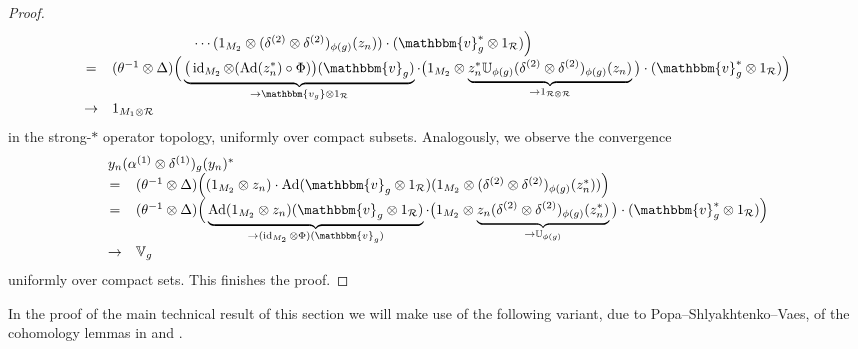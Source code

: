 \documentclass[11pt,a4paper]{article}
\theoremstyle{definition}
\theoremstyle{remark}
\numberwithin{equation}{section}
\numberwithin{theorem}{section}
\begin{document}
\begin{proof}
\[\begin{array}{cl}
& \phantom{ (\theta^{-1}\otimes\operatorname{id}_{\mathcal{R}})\Big( }\cdots (1_{M_2}\otimes(\delta^{(2)}\otimes\delta^{(2)})_{\phi(g)}(z_n))\cdot (\mathbbm{v}_g^* \otimes 1_{\mathcal R}) \Big) \\
=& (\theta^{-1}\otimes\Delta)\Big( \underbrace{ \big( \operatorname{id}_{M_2}\otimes (  \operatorname{Ad}(z_n^*)\circ\Phi ) \big) (\mathbbm{v}_g) }_{\to \mathbbm{v_g}\otimes 1_{\mathcal R} } 
\cdot \big( 1_{M_2}\otimes \underbrace{ z_n^*\mathbb{U}_{\phi(g)}(\delta^{(2)}\otimes\delta^{(2)})_{\phi(g)}(z_n) }_{\to 1_{\mathcal{R}\otimes\mathcal{R}} } \big)\cdot (\mathbbm{v}_g^* \otimes 1_{\mathcal R}) \Big) \\
\to & 1_{M_1\otimes\mathcal R} 
\end{array}
\]
in the strong-$*$ operator topology, uniformly over compact subsets.
Analogously, we observe the convergence
\[
\begin{array}{cl}
\multicolumn{2}{l}{ y_n(\alpha^{(1)}\otimes\delta^{(1)})_g(y_n)^* }\\
=& (\theta^{-1}\otimes\Delta)\Big( (1_{M_2}\otimes z_n) \cdot \operatorname{Ad}(\mathbbm{v}_g\otimes 1_{\mathcal R})(1_{M_2}\otimes(\delta^{(2)}\otimes\delta^{(2)})_{\phi(g)}(z_n^*) ) \Big) \\
=& (\theta^{-1}\otimes\Delta)\Big( \underbrace{ \operatorname{Ad}(1_{M_2}\otimes z_n)(\mathbbm{v}_g\otimes 1_{\mathcal R})}_{\to (\operatorname{id}_{M_2}\otimes\Phi)(\mathbbm{v}_g)}
 \cdot \big( 1_{M_2}\otimes \underbrace{ z_n(\delta^{(2)}\otimes\delta^{(2)})_{\phi(g)}(z_n^*) }_{\to \mathbb{U}_{\phi(g)} } \big) \cdot (\mathbbm{v}_g^*\otimes 1_{\mathcal R}) \Big) \\
\to & \mathbb{V}_g
\end{array}
\]
uniformly over compact sets.
This finishes the proof.
\end{proof}

In the proof of the main technical result of this section we will make use of the following variant, due to Popa--Shlyakhtenko--Vaes, of the cohomology lemmas in \cite[Appendix]{JonesTakesaki84} and \cite[Theorem 5.5]{Sutherland85}.
\end{document}
